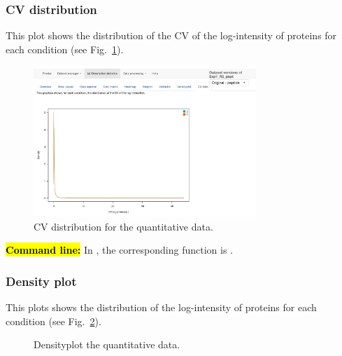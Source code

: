 \documentclass[12pt]{article}
\begin{document}
{%

\subsubsection{CV distribution}
This plot shows the distribution of the CV of the log-intensity of 
proteins for each condition (see Fig.~\ref{fig:sdvd}).

\begin {figure}
\centering
\includegraphics[width=0.75\textwidth]{images/desc_CVDist.png}
\caption{CV distribution for the quantitative data.}\label{fig:sdvd}
\end {figure}

\hl{\bf Command line:} In , the corresponding function is 
.

\subsubsection{Density plot}\label{sec:densityplot}
This plots shows the distribution of the log-intensity of proteins for each 
condition (see Fig.~\ref{fig:sddp}).

\begin {figure}
\centering
{}
\caption{Densityplot the quantitative data.}\label{fig:sddp}
\end {figure}

}
\end{document}
